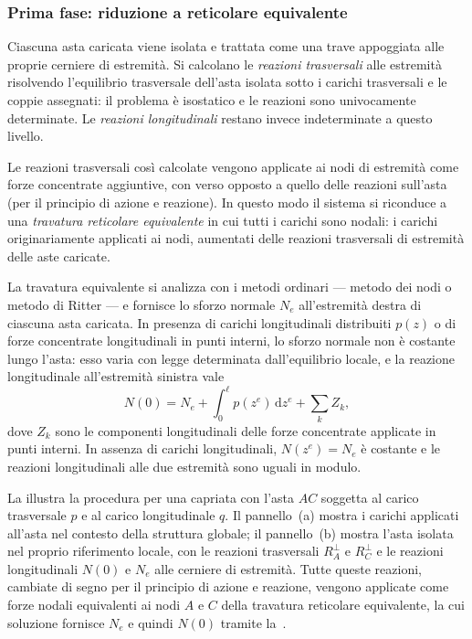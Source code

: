 \subsubsection{Prima fase: riduzione a reticolare equivalente}
\label{subsec:fase1_reticolare}

Ciascuna asta caricata viene isolata e trattata
come una trave appoggiata alle proprie cerniere di
estremità. Si calcolano le \emph{reazioni trasversali}
alle estremità risolvendo l'equilibrio trasversale
dell'asta isolata sotto i carichi trasversali e le
coppie assegnati: il problema è isostatico e le
reazioni sono univocamente determinate. Le
\emph{reazioni longitudinali} restano invece
indeterminate a questo livello.

Le reazioni trasversali così calcolate vengono
applicate ai nodi di estremità come forze concentrate
aggiuntive, con verso opposto a quello delle reazioni
sull'asta (per il principio di azione e reazione).
In questo modo il sistema si riconduce a una
\emph{travatura reticolare equivalente} in cui tutti
i carichi sono nodali: i carichi originariamente
applicati ai nodi, aumentati delle reazioni
trasversali di estremità delle aste caricate.

La travatura equivalente si analizza con i metodi
ordinari --- metodo dei nodi o metodo di Ritter ---
e fornisce lo sforzo normale $N_e$ all'estremità
destra di ciascuna asta caricata. In presenza di
carichi longitudinali distribuiti $p(z)$ o di
forze concentrate longitudinali in punti interni,
lo sforzo normale non è costante lungo l'asta:
esso varia con legge determinata dall'equilibrio
locale, e la reazione longitudinale all'estremità
sinistra vale
\begin{equation}\label{eq:reazione_long_sinistra}
	N(0) = N_e + \int_0^\ell p(z^e)\,\mathrm{d}z^e
	+ \sum_k Z_k,
\end{equation}
dove $Z_k$ sono le componenti longitudinali
delle forze concentrate applicate in punti interni.
In assenza di carichi longitudinali, $N(z^e) = N_e$
è costante e le reazioni longitudinali alle due
estremità sono uguali in modulo.

La  illustra la procedura
per una capriata con l'asta $AC$ soggetta al carico
trasversale $p$ e al carico longitudinale $q$.
Il pannello~(a) mostra i carichi applicati all'asta
nel contesto della struttura globale; il pannello~(b)
mostra l'asta isolata nel proprio riferimento locale,
con le reazioni trasversali $R_A^\perp$ e $R_C^\perp$
e le reazioni longitudinali $N(0)$ e $N_e$ alle
cerniere di estremità. Tutte queste reazioni,
cambiate di segno per il principio di azione e
reazione, vengono applicate come forze nodali
equivalenti ai nodi $A$ e $C$ della travatura
reticolare equivalente, la cui soluzione fornisce
$N_e$ e quindi $N(0)$ tramite
la~.



